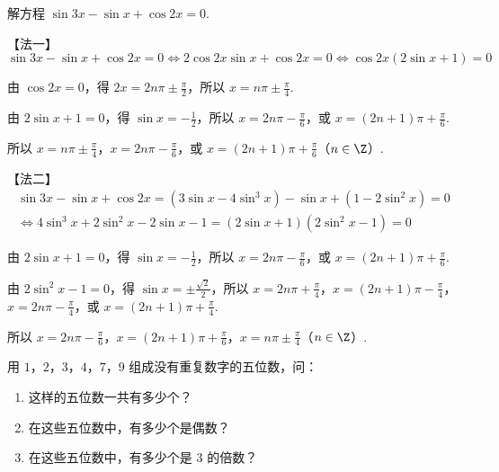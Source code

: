 \begin{problem}
解方程 \(\sin 3x-\sin x+\cos 2x=0\).
\end{problem}

\begin{solution}
【法一】
\[
\sin 3x-\sin x+\cos 2x=0
\Longleftrightarrow 2\cos 2x\sin x+\cos 2x=0
\Longleftrightarrow \cos 2x\left( 2\sin x+1 \right)=0
\]

由 \(\cos 2x=0\)，得 \(2x=2n\pi\pm\frac{\pi}{2}\)，所以 \(x=n\pi\pm\frac{\pi}{4}\).

由 \(2\sin x+1=0\)，得 \(\sin x=-\frac12\)，所以 \(x=2n\pi-\frac{\pi}{6}\)，或 \(x=\left( 2n+1 \right)\pi+\frac{\pi}{6}\).

所以 \(x=n\pi\pm\frac{\pi}{4}\)，\(x=2n\pi-\frac{\pi}{6}\)，或 \(x=\left( 2n+1 \right)\pi+\frac{\pi}{6}\)（\(n\in\Z\)）.

【法二】
\[
\begin{gathered}
\sin 3x-\sin x+\cos 2x
=\left( 3\sin x-4\sin^3x \right)-\sin x+\left( 1-2\sin^2x \right)=0\\
\Longleftrightarrow 4\sin^3x+2\sin^2x-2\sin x-1
=\left( 2\sin x+1 \right)\left( 2\sin^2x-1 \right)=0
\end{gathered}
\]

由 \(2\sin x+1=0\)，得 \(\sin x=-\frac12\)，所以 \(x=2n\pi-\frac{\pi}{6}\)，或 \(x=\left( 2n+1 \right)\pi+\frac{\pi}{6}\).

由 \(2\sin^2x-1=0\)，得 \(\sin x=\pm\frac{\sqrt2}{2}\)，所以 \(x=2n\pi+\frac{\pi}{4}\)，\(x=\left( 2n+1 \right)\pi-\frac{\pi}{4}\)，\(x=2n\pi-\frac{\pi}{4}\)，或 \(x=\left( 2n+1 \right)\pi+\frac{\pi}{4}\).

所以 \(x=2n\pi-\frac{\pi}{6}\)，\(x=\left( 2n+1 \right)\pi+\frac{\pi}{6}\)，\(x=n\pi\pm\frac{\pi}{4}\)（\(n\in\Z\)）.
\end{solution}

\begin{problem}
用 \(1\)，\(2\)，\(3\)，\(4\)，\(7\)，\(9\) 组成没有重复数字的五位数，问：

\begin{enumerate}
\item 这样的五位数一共有多少个？
\item 在这些五位数中，有多少个是偶数？
\item 在这些五位数中，有多少个是 \(3\) 的倍数？
\end{enumerate}
\end{problem}

